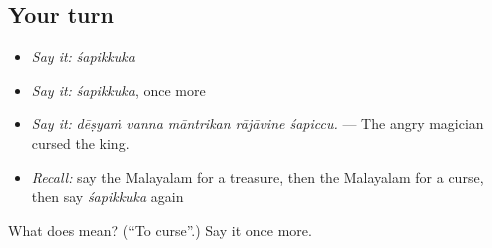 \subsection*{Your turn}
\begin{itemize}
\raggedright
  \item \emph{Say it:} \emph{śapikkuka}
  \item \emph{Say it:} \emph{śapikkuka}, once more
  \item \emph{Say it:} \emph{dēṣyaṁ vanna māntrikan rājāvine śapiccu.} — The angry magician cursed the king.
  \item \emph{Recall:} say the Malayalam for a treasure, then the Malayalam for a curse, then say \emph{śapikkuka} again
\end{itemize}

\begin{tcolorbox}[breakable,colback=teal!4,colframe=teal!35!black,title={Before you move on}]
What does  mean? (\textquotedblleft{}To curse\textquotedblright{}.) Say it once more.
\end{tcolorbox}
